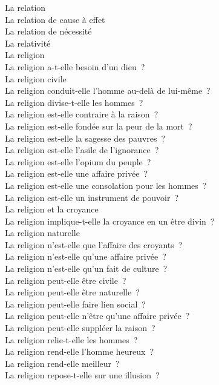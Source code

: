 \documentclass[a4paper,12pt]{article}
\begin{document}
La relation \\
La relation de cause à effet \\
La relation de nécessité \\
La relativité \\
La religion \\
La religion a-t-elle besoin d'un dieu ? \\
La religion civile \\
La religion conduit-elle l'homme au-delà de lui-même ? \\
La religion divise-t-elle les hommes ? \\
La religion est-elle contraire à la raison ? \\
La religion est-elle fondée sur la peur de la mort ? \\
La religion est-elle la sagesse des pauvres ? \\
La religion est-elle l'asile de l'ignorance ? \\
La religion est-elle l'opium du peuple ? \\
La religion est-elle une affaire privée ? \\
La religion est-elle une consolation pour les hommes ? \\
La religion est-elle un instrument de pouvoir ? \\
La religion et la croyance \\
La religion implique-t-elle la croyance en un être divin ? \\
La religion naturelle \\
La religion n'est-elle que l'affaire des croyants ? \\
La religion n'est-elle qu'une affaire privée ? \\
La religion n'est-elle qu'un fait de culture ? \\
La religion peut-elle être civile ? \\
La religion peut-elle être naturelle ? \\
La religion peut-elle faire lien social ? \\
La religion peut-elle n'être qu'une affaire privée ? \\
La religion peut-elle suppléer la raison ? \\
La religion relie-t-elle les hommes ? \\
La religion rend-elle l'homme heureux ? \\
La religion rend-elle meilleur ? \\
La religion repose-t-elle sur une illusion ? \\
\end{document}
